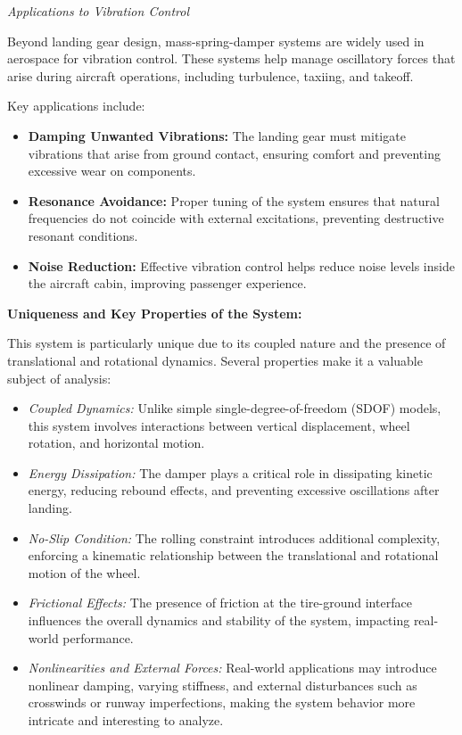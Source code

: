 \documentclass[12pt,letterpaper, onecolumn]{exam}
\begin{document}
\begin{questions}
\begin{solution}
\begin{parts}
\textit{Applications to Vibration Control}

Beyond landing gear design, mass-spring-damper systems are widely used in aerospace for vibration control. These systems help manage oscillatory forces that arise during aircraft operations, including turbulence, taxiing, and takeoff.

Key applications include:
\begin{itemize}
    \item \textbf{Damping Unwanted Vibrations:} The landing gear must mitigate vibrations that arise from ground contact, ensuring comfort and preventing excessive wear on components.
    \item \textbf{Resonance Avoidance:} Proper tuning of the system ensures that natural frequencies do not coincide with external excitations, preventing destructive resonant conditions.
    \item \textbf{Noise Reduction:} Effective vibration control helps reduce noise levels inside the aircraft cabin, improving passenger experience.
\end{itemize}

\vspace{5mm}

                \textbf{Uniqueness and Key Properties of the System:}

                \vspace{5mm}
                    This system is particularly unique due to its coupled nature and the presence of translational and rotational dynamics. Several properties make it a valuable subject of analysis:
                        \begin{itemize}
                            \item \textit{Coupled Dynamics:} Unlike simple single-degree-of-freedom (SDOF) models, this system involves interactions between vertical displacement, wheel rotation, and horizontal motion.
                            \item \textit{Energy Dissipation:} The damper plays a critical role in dissipating kinetic energy, reducing rebound effects, and preventing excessive oscillations after landing.
                            \item \textit{No-Slip Condition:} The rolling constraint introduces additional complexity, enforcing a kinematic relationship between the translational and rotational motion of the wheel.
                            \item \textit{Frictional Effects:} The presence of friction at the tire-ground interface influences the overall dynamics and stability of the system, impacting real-world performance.
                            \item \textit{Nonlinearities and External Forces:} Real-world applications may introduce nonlinear damping, varying stiffness, and external disturbances such as crosswinds or runway imperfections, making the system behavior more intricate and interesting to analyze.
                        \end{itemize}


\end{parts}
\end{solution}
\end{questions}
\end{document}
